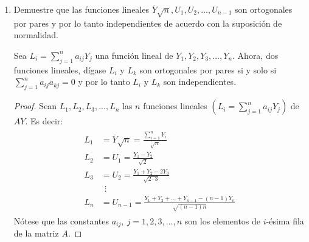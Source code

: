 \documentclass[a4paper,12pt]{article}
\begin{document}
\begin{enumerate}
\begin{proof}
\begin{align}
\begin{split}
\begin{array}{c}
U_3\\
\vdots \\
U_{n-1}
\end{array}\right]
\end{split}
\intertext{Entonces, ahora tenemos que:}
\begin{split}
\sum_{i=1}^{n} Y_{i}^{2} &=Y^{t} Y=Y^{t} A^{t} A Y = (AY)^t+ AY\\
&=   \left[
\overline{Y} \sqrt{n} \quad 
U_{1} \quad 
U_{2} \quad 
U_3 \quad 
... \quad 
U_{n-1}
\right]
\left[\begin{array}{c}
\overline{Y} \sqrt{n} \\
U_{1} \\
U_{2} \\
U_3\\
\vdots \\
U_{n-1}
\end{array}\right]\\
&= \left[\overline{Y}^2n+ U_1^2+U_2^2+U_3^2+...+U_{n-1}^2\right]\\
&= n \overline{Y}^{2}+\sum_{i=1}^{n-1} U_{i}^{2}
\end{split}
\end{align}
\end{proof}

\item  Demuestre que las funciones lineales $\overline{Y} \sqrt{n}, U_{1}, U_{2}, \ldots, U_{n-1}$ son ortogonales por pares y por lo tanto independientes de acuerdo con la suposición de normalidad.
\begin{tcolorbox}[colback=gray!15,colframe=black!1!black,title=Definición]
Sea $L_i= \sum_{j=1}^n a_{ij}Y_j$ una función lineal de $Y_1,Y_2,Y_3,...,Y_n$. Ahora, dos funciones lineales, dígase $L_i$ y $L_k$ son ortogonales por pares si y solo si $\sum_{j=1}^n a_{ij}a_{kj}=0$ y por lo tanto $L_i$ y $L_k$ son independientes.
\end{tcolorbox}
\begin{proof}
Sean $L_1,L_2,L_3,..., L_n$ las $n$ funciones lineales $\left(L_i=\sum_{j=1}^n a_{ij}Y_j\right)$ de $AY$. Es decir:
\begin{align*}
\begin{split}
    L_1 &= \overline{Y}\sqrt{n} = \frac{\sum_{i=1}^n Y_i}{\sqrt{n}}\\
    L_2 &= U_1 =\frac{Y_1-Y_2}{\sqrt{2}}\\
    L_3 &= U_2 =\frac{Y_1+Y_2-2Y_3}{\sqrt{2\cdot 3}}\\
        & \ \ \vdots \\ 
    L_n &= U_{n-1} =\frac{Y_1+Y_2+...+Y_{n-1}- (n-1)Y_n}{\sqrt{(n-1)n}}
    \end{split}
\end{align*}
Nótese que las constantes $a_{ij}, \ j=1,2,3,...,n$ son los elementos de $i$-ésima fila de la matriz $A$.


\end{proof}
\end{enumerate}
\end{document}
